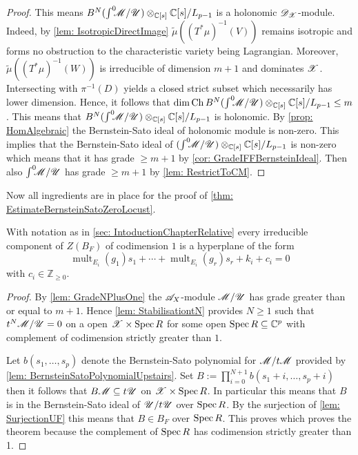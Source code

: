 \begin{proof}
  This means $B^N(\int^0 \mkern -8mu\mathscr{M}/ \mathscr{U})\otimes_{\mathbb{C}[s]}\mathbb{C}[s]/L_{p-1}$ is a holonomic $\mathscr{D}_{\mathscr{X}}$-module.
  Indeed, by \cref{lem: IsotropicDirectImage} $\widetilde{\mu}((T^*\mu)^{-1}(V))$ remains isotropic and forms no obstruction to the characteristic variety being Lagrangian.
  Moreover, $\widetilde{\mu}((T^*\mu)^{-1}(W))$ is irreducible of dimension $m+1$ and dominates $\mathscr{X}$.
  Intersecting with $\pi^{-1}(D)$ yields a closed strict subset which necessarily has lower dimension.
  Hence, it follows that $\dim \operatorname{Ch} B^N (\int^0 \mkern -8mu\mathscr{M}/ \mathscr{U})\otimes_{\mathbb{C}[s]}\mathbb{C}[s]/L_{p-1} \leq m$.
  This means that $B^N(\int^0 \mkern -8mu\mathscr{M}/ \mathscr{U})\otimes_{\mathbb{C}[s]}\mathbb{C}[s]/L_{p-1}$ is holonomic.
  By \cref{prop: HomAlgebraic} the Bernstein-Sato ideal of holonomic module is non-zero.
  This implies that the Bernstein-Sato ideal of $(\int^0 \mkern -8mu\mathscr{M}/ \mathscr{U})\otimes_{\mathbb{C}[s]}\mathbb{C}[s]/L_{p-1}$ is non-zero which means that it has grade $\geq m+1$ by \cref{cor: GradeIFFBernsteinIdeal}.
  Then also $\int^0 \mkern -8mu\mathscr{M}/\mathscr{U}$ has grade $\geq m+1$ by \cref{lem: RestrictToCM}.
  \end{proof}
Now all ingredients are in place for the proof of \cref{thm: EstimateBernsteinSatoZeroLocust}.
\begin{theorem}
  With notation as in \cref{sec: IntoductionChapterRelative} every irreducible component of $Z(B_F)$ of codimension $1$ is a hyperplane of the form
  $$\operatorname{mult}_{E_i}(g_1) s_1 + \cdots + \operatorname{mult}_{E_i}(g_r)s_r + k_i + c_i=0$$
  with $c_i \in \mathbb{Z}_{\geq 0 }$.
\end{theorem}
\begin{proof}
  By \cref{lem: GradeNPlusOne} the $\mathscr{A}_X$-module $\mathscr{M}/\mathscr{U}$ has grade greater than or equal to $m + 1$. Hence \cref{lem: StabilisationtN} provides $N\geq 1$ such that $t^N\mathscr{M}/\mathscr{U} = 0$ on a open $\mathscr{X}\times\operatorname{Spec} R$ for some open $\operatorname{Spec} R\subseteq \mathbb{C}^p$ with complement of codimension strictly greater than $1$.

  Let $b(s_1,\ldots,s_p)$ denote the Bernstein-Sato polynomial for $\mathscr{M}/t\mathscr{M}$ provided by \cref{lem: BernsteinSatoPolynomialUpstairs}.
  Set $B := \prod_{i=0}^{N+1} b(s_1 + i, \ldots, s_p + i)$ then it follows that
  $B\mathscr{M} \subseteq t\mathscr{U}$ on $\mathscr{X} \times \operatorname{Spec} R$.
  In particular this means that $B$ is in the Bernstein-Sato ideal of $\mathscr{U}/t\mathscr{U}$ over $\operatorname{Spec} R$.
  By the surjection of \cref{lem: SurjectionUF} this means that $B\in B_F$ over $\operatorname{Spec} R$. This proves which proves the theorem because the complement of $\operatorname{Spec} R$ has codimension strictly greater than 1.
\end{proof}
